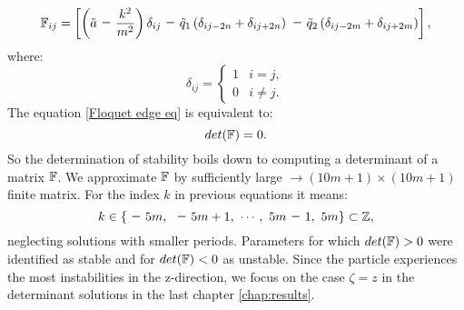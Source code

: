 \begin{equation}
	\tensorq{F}_{i j} = \left[ \left(\tilde{a} \minus \dfrac{k^2}{m^2} \right)\delta_{i j} \minus \tilde{q}_1 \left(\delta_{i j-2n} + \delta_{i j+2n} \right) \minus \tilde{q}_2 \left(\delta_{i j-2m} + \delta_{i j+2m} \right)  \right],
\end{equation} 
where:
\begin{equation}
	\delta_{ij} = 
	\begin{cases}
		1 & i=j, \\
		0 & i \neq j.
	\end{cases}	
\end{equation}
The equation \eqref{Floquet edge eq} is equivalent to:
\begin{equation}
	\label{Floquet determinant}
	det(\mathbb{F}) = 0.
\end{equation}
So the determination of stability boils down to computing a determinant of a matrix $\mathbb{F}$. We approximate $\mathbb{F}$ by sufficiently large $\rightarrow (10m+1) \times (10m+1)$ finite matrix. For the index $k$ in previous equations it means: $$k \in \{ \minus 5m, \ \minus 5m+1, \  \cdots, \ 5m \minus 1, \ 5m \} \subset \Z,$$ neglecting solutions with smaller periods. Parameters for which $det(\mathbb{F}) > 0$ were identified as stable and for $det(\mathbb{F}) < 0$ as unstable. Since the particle experiences the most instabilities in the z-direction, we focus on the case $\zeta = z$ in the determinant solutions in the last chapter \ref{chap:results}.
 	
